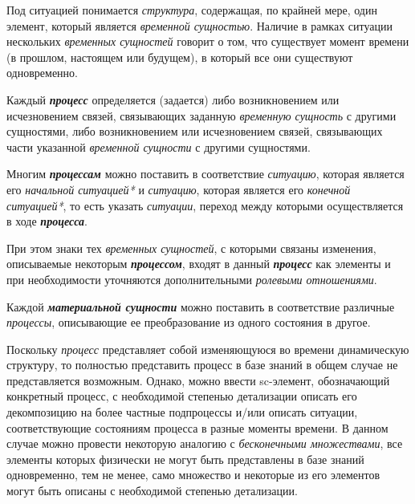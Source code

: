 Под ситуацией понимается \textit{структура}, содержащая, по крайней мере, один элемент, который является \textit{временной сущностью}. Наличие в рамках ситуации нескольких \textit{временных сущностей} говорит о том, что существует момент времени (в прошлом, настоящем или будущем), в который все они существуют одновременно.

\begin{SCn}
\end{SCn}

Каждый \textbf{\textit{процесс}} определяется (задается) либо возникновением или исчезновением связей, связывающих заданную \textit{временную сущность} с другими сущностями, либо возникновением или исчезновением связей, связывающих части указанной \textit{временной сущности} с другими сущностями. 
			
Многим \textbf{\textit{процессам}} можно поставить в соответствие \textit{ситуацию}, которая является его \textit{начальной ситуацией*} и \textit{ситуацию}, которая является его \textit{конечной ситуацией*}, то есть указать \textit{ситуации}, переход между которыми осуществляется в ходе \textbf{\textit{процесса}}.
			
При этом знаки тех \textit{временных сущностей}, с которыми связаны изменения, описываемые некоторым \textbf{\textit{процессом}}, входят в данный \textbf{\textit{процесс}} как элементы и при необходимости уточняются дополнительными \textit{ролевыми отношениями}.

\begin{SCn}
\begin{scnsubdividing}
\end{scnsubdividing}
\end{SCn}

Каждой \textbf{\textit{материальной сущности}} можно поставить в соответствие различные \textit{процессы}, описывающие ее преобразование из одного состояния в другое.

Поскольку \textit{процесс} представляет собой изменяющуюся во времени динамическую структуру, то полностью представить процесс в базе знаний в общем случае не представляется возможным.
Однако, можно ввести sc-элемент, обозначающий конкретный процесс, с необходимой степенью детализации описать его декомпозицию на более частные подпроцессы и/или описать ситуации, соответствующие состояниям процесса в разные моменты времени.
В данном случае можно провести некоторую аналогию с \textit{бесконечными множествами}, все элементы которых физически не могут быть представлены в базе знаний одновременно, тем не менее, само множество и некоторые из его элементов могут быть описаны с необходимой степенью детализации.
	
